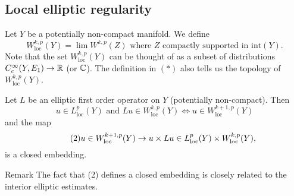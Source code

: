  \subsection*{Local elliptic regularity}
 \begin{defn}
   Let $Y$ be a potentially non-compact manifold. We define
   \begin{equation*}\tag{$\ast$}
     W^{k,p}_{\text{loc}}(Y)=\lim W^{k,p}(Z)\text{ where $Z$ compactly
       supported in $\text{int}(Y)$}.
   \end{equation*}
   Note that the set $W^{k,p}_{\text{loc}}(Y)$ can be thought of as
   a subset of distributions $C^{\infty}_{c}(Y,E_{1})\to \mathbb{R}$ (or
   $\mathbb{C}$). The definition in $(\ast)$ also tells us the topology of
   $W^{k,p}_{\text{loc}}(Y)$.
 \end{defn}
 \begin{thm}\label{thm:localellipticregularity}
   Let $L$ be an elliptic first order operator on $Y$ (potentially
   non-compact). Then
   \begin{equation*}\tag{1}
     u\in L^{p}_{\text{loc}}(Y)\text{ and }Lu\in
     W^{k,p}_{\text{loc}}(Y)\iff u\in W^{k+1,p}_{\text{loc}}(Y)
   \end{equation*}
   and the map
   \begin{equation*}\tag{2}
     u\in W^{k+1,p}_{\text{loc}}(Y)\to u\times Lu\in
     L^{p}_{\text{loc}}(Y)\times W^{k,p}_{\text{loc}}(Y),
   \end{equation*}
   is a closed embedding.
 \end{thm}
 \begin{clear}{Remark}
   The fact that (2) defines a closed embedding is closely related to
   the interior elliptic estimates.
 \end{clear}
